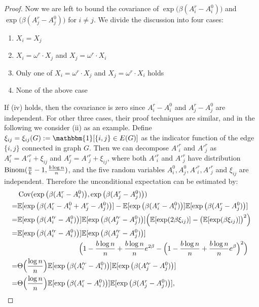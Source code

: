 \documentclass{article}
\begin{document}
\begin{proof}
Now we are left to bound the covariance of $\exp\big(\beta (A^r_i-A^0_i) \big)$ and $\exp\big(\beta (A^r_j-A^0_j) \big)$ for $i\neq j$.
We divide the discussion into four cases:
\begin{enumerate}[label=(\roman*)]
	\item $X_i = X_j$
	\item $X_i = \omega^r \cdot X_j$ and $X_j = \omega^r \cdot X_i$
	\item Only one of $X_i = \omega^r \cdot X_j$ and $X_j = \omega^r \cdot X_i$ holds
	\item None of the above case
\end{enumerate}
If (iv) holds, then the covariance is zero since $A^r_i-A^0_i$ and $A^r_j-A^0_j$ are independent.
For other three cases, their proof techniques are similar,
and in the following we consider (ii) as an example.
Define $\xi_{ij}=\xi_{ij}(G):=\mathbbm{1}[\{i,j\}\in E(G)]$ as the indicator function of the edge $\{i,j\}$ connected in graph $G$.
Then we can decompose $A'^r_i$ and $A'^r_j$ as $A^r_i=A'^r_i+\xi_{ij}$ and $A^r_j=A'^r_j+\xi_{ij}$, where both $A'^r_i$ and $A'^r_j$ have distribution
$\operatorname{Binom}(\frac{n}{k} - 1 , \frac{b\log n}{n})$,
and the five random variables $A^0_i, A^0_j, A'^r_i,A'^r_j$ and $\xi_{ij}$ are independent.
Therefore the unconditional expectation can be estimated by:
\begin{align*}
& \Cov(\exp\big(\beta (A^r_i-A^0_i) \big), \exp\big(\beta (A^r_j-A^0_j) \big) ) \\
= & \mathbb{E}[\exp\big(\beta (A^r_i-A^0_i+A^r_j-A^0_j) \big)] 
-\mathbb{E}[\exp\big(\beta (A^r_i-A^0_i) \big)] \mathbb{E}[\exp\big(\beta (A^r_j-A^0_j) \big)]   \\
= & \mathbb{E}[\exp\big(\beta (A'^r_i-A^0_i) \big)] \mathbb{E}[\exp\big(\beta (A'^r_j-A^0_j) \big)]  \Big( \mathbb{E}[\exp(2\beta \xi_{ij})] -
\big(\mathbb{E}[\exp(\beta \xi_{ij})]\big)^2 \Big) \\
= & \mathbb{E}[\exp\big(\beta (A'^r_i-A^0_i) \big)] \mathbb{E}[\exp\big(\beta (A'^r_j-A^0_j) \big)] \\
& \hspace*{1.2in}
\Big( 1-\frac{b\log n}{n} + \frac{b\log n}{n} e^{2\beta} -
\Big(1-\frac{b\log n}{n} + \frac{b\log n}{n} e^{\beta} \Big)^2 \Big) \\
= & \Theta\Big( \frac{\log n}{n} \Big) \mathbb{E}[\exp\big(\beta (A'^r_i-A^0_i) \big)] \mathbb{E}[\exp\big(\beta (A'^r_j-A^0_j) \big)] \\
= & \Theta\Big( \frac{\log n}{n} \Big) \mathbb{E}[\exp\big(\beta (A^r_i-A^0_i) \big)] \mathbb{E}[\exp\big(\beta (A^r_j-A^0_j) \big)]  ,

\end{align*}
\end{proof}
\end{document}
